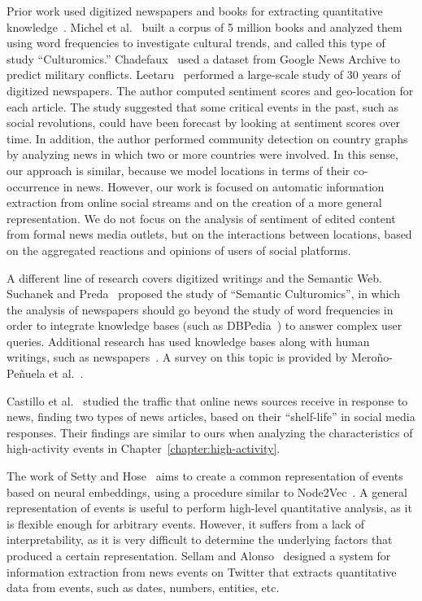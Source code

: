 Prior work used digitized newspapers and books for extracting quantitative
knowledge~\cite{Michel176,leetaru2011culturomics,chadefaux2014early}. 
%
Michel et al.~\cite{Michel176} built a corpus of 5 million books and analyzed
them using word frequencies to investigate cultural trends, and called this type
of study ``Culturomics.''
%
Chadefaux~\cite{chadefaux2014early} used a dataset from Google News Archive to
predict military conflicts.
%
Leetaru~\cite{leetaru2011culturomics} performed a large-scale study of 30 years
of digitized newspapers.
%
The author computed sentiment scores and geo-location for each article.
%
The study suggested that some critical events in the past, such as social
revolutions, could have been forecast by looking at sentiment scores over
time.
%
In addition, the author performed community detection on country graphs by
analyzing news in which two or more countries were involved.  
%
In this sense, our approach is similar, because we model locations in terms of
their co-occurrence in news. 
%
However, our work is focused on automatic information extraction from online
social streams and on the creation of a more general representation.  
%
We do not focus on the analysis of sentiment of edited content from formal news
media outlets, but on the interactions between locations, based on the
aggregated reactions and opinions of users of social platforms.
%


A different line of research covers digitized writings and the Semantic Web.
%
Suchanek and Preda~\cite{Suchanek:2014:SC:2732977.2732994} proposed the study of
``Semantic Culturomics'', in which the analysis of newspapers should go beyond
the study of word frequencies in order to integrate knowledge bases (such as
DBPedia~\cite{dbpedia}) to answer complex user queries. 
%
Additional research has used knowledge bases along with human writings, such as
newspapers~\cite{Huet:2013:MHL:2509558.2509567,DS/CN175}. 
%
A survey on this topic is provided by Mero\~no-Pe\~nuela et
al.~\cite{merono2014semantic}.

Castillo et al.~\cite{Castillo:2014} studied the traffic
that online news sources receive in response to news, finding two types of news
articles, based on their ``shelf-life'' in social media responses. 
%
Their findings are similar to ours when analyzing the characteristics of
high-activity events in Chapter~\ref{chapter:high-activity}.
%

The work of Setty and Hose~\cite{Setty:2018:ENE:3209978.3210136} aims to create
a common representation of events based on neural embeddings, using a procedure
similar to Node2Vec~\cite{Grover:2016:NSF:2939672.2939754}.
%
A general representation of events is useful to perform high-level quantitative
analysis, as it is flexible enough for arbitrary events.
%
However, it suffers from a lack of interpretability, as it is very difficult to determine
the underlying factors that produced a certain representation.
%
Sellam and Alonso~\cite{10.1007/978-3-319-19890-3_17} designed a system for
information extraction from news events on Twitter that extracts quantitative
data from events, such as dates, numbers, entities, etc.


